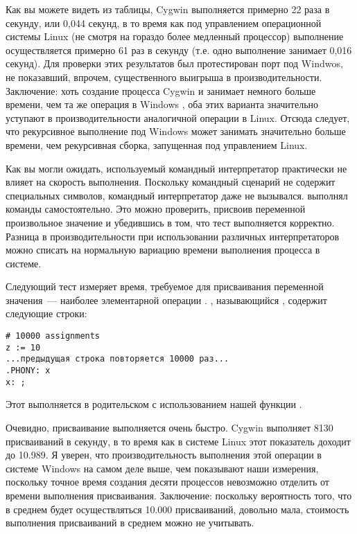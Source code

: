 Как вы можете видеть из таблицы, Cygwin \GNUmake{} выполняется
примерно 22 раза в секунду, или 0,044 секунд, в то время как под
управлением операционной системы Linux (не смотря на гораздо более
медленный процессор) выполнение осуществляется примерно 61 раз в
секунду (т.е. одно выполнение занимает 0,016 секунд). Для проверки
этих результатов был протестирован порт \GNUmake{} под Windwos, не
показавший, впрочем, существенного выигрыша в производительности.
Заключение: хоть создание процесса Cygwin \GNUmake{} и
занимает немного больше времени, чем та же операция в Windows
\GNUmake{}, оба этих варианта значительно уступают в
производительности аналогичной операции в Linux. Отсюда следует, что
рекурсивное выполнение \GNUmake{} под Windows может занимать
значительно больше времени, чем рекурсивная сборка, запущенная под
управлением Linux.

Как вы могли ожидать, используемый командный интерпретатор практически
не влияет на скорость выполнения. Поскольку командный сценарий не
содержит специальных символов, командный интерпретатор даже не
вызывался. \GNUmake{} выполнял команды самостоятельно. Это можно
проверить, присвоив переменной  произвольное значение
и убедившись в том, что тест выполняется корректно. Разница в
производительности при использовании различных интерпретаторов можно
списать на нормальную вариацию времени выполнения процесса в системе.

Следующий тест измеряет время, требуемое для присваивания переменной
значения~--- наиболее элементарной операции \GNUmake{}. \makefile{},
называющийся , содержит следующие строки:

{\footnotesize
\begin{verbatim}
# 10000 assignments
z := 10
...предыдущая строка повторяется 10000 раз...
.PHONY: x
x: ;
\end{verbatim}
}

Этот \makefile{} выполняется в родительском  с
использованием нашей функции .

Очевидно, присваивание выполняется очень быстро. Cygwin \GNUmake{}
выполняет 8130 присваиваний в секунду, в то время как в системе Linux
этот показатель доходит до 10.989. Я уверен, что производительность
выполнения этой операции в системе Windows на самом деле выше, чем
показывают наши измерения, поскольку точное время создания десяти
процессов \GNUmake{} невозможно отделить от времени выполнения
присваивания. Заключение: поскольку вероятность того, что в среднем
 будет осуществляться 10.000 присваиваний, довольно мала,
стоимость выполнения присваиваний в среднем  можно не
учитывать.

